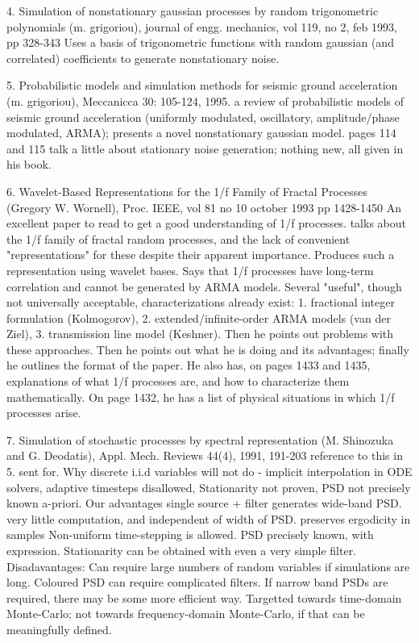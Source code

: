 \documentclass[9pt,times]{article}
\begin{document}
{{		4. Simulation of nonstationary gaussian processes by random
		trigonometric polynomials (m. grigoriou), journal of engg.
		mechanics, vol 119, no 2, feb 1993, pp 328-343
			Uses a basis of trigonometric functions with random
			gaussian (and correlated) coefficients to generate
			nonstationary noise.

		5. Probabilistic models and simulation methods for seismic
		ground acceleration (m. grigoriou), Meccanicca 30: 105-124,
		1995.
			a review of probabilistic models of seismic ground
			acceleration (uniformly modulated, oscillatory,
			amplitude/phase modulated, ARMA); presents a novel
			nonstationary gaussian model. pages 114 and 115 talk
			a little about stationary noise generation; nothing
			new, all given in his book.

		6. Wavelet-Based Representations for the 1/f Family of
		Fractal Processes (Gregory W. Wornell), Proc. IEEE, vol 81
		no 10 october 1993 pp 1428-1450
			An excellent paper to read to get a good
			understanding of 1/f processes.
			talks about the 1/f family of fractal random
			processes, and the lack of convenient
			"representations" for these despite their apparent
			importance. Produces such a representation using
			wavelet bases. Says that 1/f processes have
			long-term correlation and cannot be generated by
			ARMA models. Several "useful", though not
			universally acceptable, characterizations already
			exist: 1. fractional integer formulation (Kolmogorov),
			2. extended/infinite-order ARMA models (van der Ziel),
			3. transmission line model (Keshner). Then he points
			out problems with these approaches. Then he points
			out what he is doing and its advantages; finally he
			outlines the format of the paper.
			He also has, on pages 1433 and 1435, explanations of
			what 1/f processes are, and how to characterize them
			mathematically. On page 1432, he has a list of physical
			situations in which 1/f processes arise.

		7. Simulation of stochastic processes by spectral
		representation (M. Shinozuka and G. Deodatis), Appl. Mech.
		Reviews 44(4), 1991, 191-203
			reference to this in 5. sent for.
	Why discrete i.i.d variables will not do - implicit
		interpolation in ODE solvers, adaptive timesteps disallowed,
		Stationarity not proven, PSD not precisely known a-priori.
	Our advantages
		single source + filter generates wide-band PSD.
		very little computation, and independent of width of PSD.
		preserves ergodicity in samples
		Non-uniform time-stepping is allowed.
		PSD precisely known, with expression.
		Stationarity can be obtained with even a very simple filter.
	Disadavantages:
		Can require large numbers of random variables if simulations
			are long.
		Coloured PSD can require complicated filters.
		If narrow band PSDs are required, there may be some more
			efficient way.
		Targetted towards time-domain Monte-Carlo; not towards
		frequency-domain Monte-Carlo, if that can be meaningfully
		defined.
}

}
\end{document}
